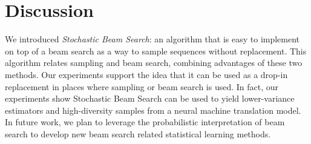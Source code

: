 \section{Discussion}
We introduced \emph{Stochastic Beam Search}: an algorithm that is easy to implement on top of a beam search as a way to sample sequences without replacement. This algorithm relates sampling and beam search, combining advantages of these two methods. Our experiments support the idea that it can be used as a drop-in replacement in places where sampling or beam search is used. In fact, our experiments show Stochastic Beam Search can be used to yield lower-variance estimators and high-diversity samples from a neural machine translation model. In future work, we plan to leverage the probabilistic interpretation of beam search to develop new beam search related statistical learning methods.  



